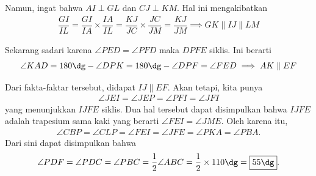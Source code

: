 Namun, ingat bahwa $AI \perp GL$ dan $CJ \perp KM$. Hal ini mengakibatkan
\begin{align*}
    \dfrac{GI}{IL} = \dfrac{GI}{IA} \times \dfrac{IA}{IL} = \dfrac{KJ}{JC} \times \dfrac{JC}{JM} = \dfrac{KJ}{JM} \implies GK \parallel IJ \parallel LM
\end{align*}

Sekarang sadari karena $\angle PED = \angle PFD$ maka $DPFE$ siklis. Ini berarti
\begin{align*}
    \angle KAD = 180\dg - \angle DPK = 180\dg - \angle DPF = \angle FED \implies AK \parallel EF
\end{align*}

Dari fakta-faktar tersebut, didapat $IJ \parallel EF$. Akan tetapi, kita punya
\begin{align*}
    \angle JEI = \angle JEP = \angle PFI = \angle JFI 
\end{align*}
yang menunjukkan $IJFE$ siklis. Dua hal tersebut dapat disimpulkan bahwa $IJFE$ adalah trapesium sama kaki yang berarti $\angle FEI = \angle JME$. Oleh karena itu,
\begin{align*}
    \angle CBP = \angle CLP = \angle  FEI = \angle JFE = \angle PKA = \angle PBA.
\end{align*}
Dari sini dapat disimpulkan bahwa
\begin{align*}
    \angle PDF = \angle PDC = \angle PBC = \frac{1}{2}\angle ABC = \frac{1}{2} \times 110\dg = \boxed{55 \dg}.
\end{align*}
